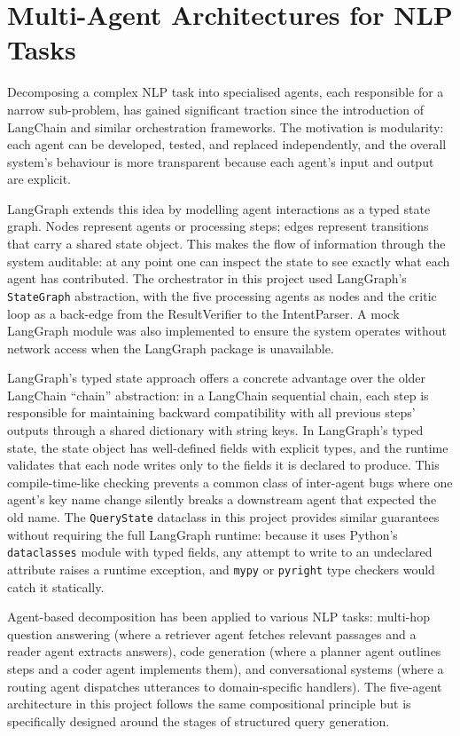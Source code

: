 \documentclass[12pt,a4paper]{report}
\begin{document}
\section{Multi-Agent Architectures for NLP Tasks}
\label{sec:multi-agent}

Decomposing a complex \ac{NLP} task into specialised agents, each responsible for a narrow sub-problem, has gained significant traction since the introduction of LangChain and similar orchestration frameworks. The motivation is modularity: each agent can be developed, tested, and replaced independently, and the overall system's behaviour is more transparent because each agent's input and output are explicit.

LangGraph \cite{langgraph} extends this idea by modelling agent interactions as a typed state graph. Nodes represent agents or processing steps; edges represent transitions that carry a shared state object. This makes the flow of information through the system auditable: at any point one can inspect the state to see exactly what each agent has contributed. The orchestrator in this project used LangGraph's \texttt{StateGraph} abstraction, with the five processing agents as nodes and the critic loop as a back-edge from the ResultVerifier to the IntentParser. A mock LangGraph module was also implemented to ensure the system operates without network access when the LangGraph package is unavailable.

LangGraph's typed state approach offers a concrete advantage over the older LangChain ``chain'' abstraction: in a LangChain sequential chain, each step is responsible for maintaining backward compatibility with all previous steps' outputs through a shared dictionary with string keys. In LangGraph's typed state, the state object has well-defined fields with explicit types, and the runtime validates that each node writes only to the fields it is declared to produce. This compile-time-like checking prevents a common class of inter-agent bugs where one agent's key name change silently breaks a downstream agent that expected the old name. The \texttt{QueryState} dataclass in this project provides similar guarantees without requiring the full LangGraph runtime: because it uses Python's \texttt{dataclasses} module with typed fields, any attempt to write to an undeclared attribute raises a runtime exception, and \texttt{mypy} or \texttt{pyright} type checkers would catch it statically.

Agent-based decomposition has been applied to various \ac{NLP} tasks: multi-hop question answering (where a retriever agent fetches relevant passages and a reader agent extracts answers), code generation (where a planner agent outlines steps and a coder agent implements them), and conversational systems (where a routing agent dispatches utterances to domain-specific handlers). The five-agent architecture in this project follows the same compositional principle but is specifically designed around the stages of structured query generation.
\end{document}
